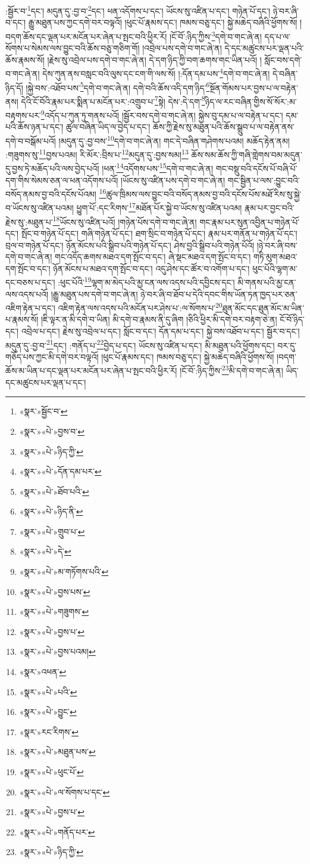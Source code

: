:སྦྱོར་བ་\footnote{«སྣར་»སྦྱོང་བ་}དང་། མདུན་དུ་:བྱ་བ་\footnote{«སྣར་»«པེ་»བྱས་བ་}དང་། ཕན་འདོགས་པ་དང་། ཡོངས་སུ་འཛིན་པ་དང་། གཉེན་པོ་དང་། ཉེ་བར་ཞི་བ་དང་། རྒྱུ་མཐུན་པས་ཀྱང་དགེ་བར་བལྟའོ། །ཕུང་པོ་རྣམས་དང་། ཁམས་བཅུ་དང་། སྐྱེ་མཆེད་བཞིའི་ཕྱོགས་སོ། །བདག་ཆོས་དང་ལྡན་པར་མངོན་པར་ཞེན་པ་སྤང་བའི་ཕྱིར་རོ། །ངོ་བོ་:ཉིད་ཀྱིས་\footnote{«སྣར་»«པེ་»ཉིད་ཀྱི་}དགེ་བ་གང་ཞེ་ན། དད་པ་ལ་སོགས་པ་སེམས་ལས་བྱུང་བའི་ཆོས་བཅུ་གཅིག་གོ། །འབྲེལ་པས་དགེ་བ་གང་ཞེ་ན། དེ་དང་མཚུངས་པར་ལྡན་པའི་ཆོས་རྣམས་སོ། །རྗེས་སུ་འབྲེལ་པས་དགེ་བ་གང་ཞེ་ན། དེ་དག་ཉིད་ཀྱི་བག་ཆགས་གང་ཡིན་པའོ། །
སློང་བས་དགེ་བ་གང་ཞེ་ན། དེས་ཀུན་ནས་བསླང་བའི་ལུས་དང་ངག་གི་ལས་སོ། །:དོན་དམ་པས་\footnote{«སྣར་»«པེ་»དོན་དམ་པར་}དགེ་བ་གང་ཞེ་ན། དེ་བཞིན་ཉིད་དོ། །སྐྱེ་བས་:འཐོབ་པས་\footnote{«སྣར་»«པེ་»ཐོབ་པའི་}དགེ་བ་གང་ཞེ་ན། དགེ་བའི་ཆོས་འདི་དག་ཉིད་\footnote{«སྣར་»«པེ་»ཉིད་ནི་}སྔོན་གོམས་པར་བྱས་པ་ལ་བརྟེན་ནས། དེའི་ངོ་བོའི་རྣམ་པར་སྨིན་པ་མངོན་པར་:འགྲུབ་པ་\footnote{«སྣར་»«པེ་»གྲུབ་པ་}སྟེ། དེས་:དེ་དག་\footnote{«སྣར་»«པེ་»དེ་}ཉིད་ལ་རང་བཞིན་གྱིས་སོ་སོར་:མ་བརྟགས་པར་\footnote{«སྣར་»«པེ་»མ་གཏོགས་པའི་}འདོད་པ་ཀུན་ཏུ་གནས་པའོ། །སྦྱོར་བས་དགེ་བ་གང་ཞེ་ན། སྐྱེས་བུ་དམ་པ་ལ་བརྟེན་པ་དང་། དམ་པའི་ཆོས་ཉན་པ་དང་། ཚུལ་བཞིན་ཡིད་ལ་བྱེད་པ་དང་། ཆོས་ཀྱི་རྗེས་སུ་མཐུན་པའི་ཆོས་སྒྲུབ་པ་ལ་བརྟེན་ནས་དགེ་བ་བསྒོམ་པའོ། །མདུན་དུ་:བྱ་བས་\footnote{«སྣར་»«པེ་»བྱས་པས་}དགེ་བ་གང་ཞེ་ན། གང་དེ་བཞིན་གཤེགས་པའམ། མཆོད་རྟེན་ནམ། :གཟུགས་སུ་\footnote{«སྣར་»«པེ་»གཟུགས་}བྱས་པའམ། རི་མོར་:བྲིས་པ་\footnote{«སྣར་»«པེ་»བྱས་པ་}མདུན་དུ་:བྱས་སམ།\footnote{«སྣར་»«པེ་»བྱས་པའམ།} ཆོས་སམ་ཆོས་ཀྱི་གཞི་གླེགས་བམ་མདུན་དུ་བྱས་ཏེ་མཆོད་པའི་ལས་བྱེད་པའོ། །ཕན་\footnote{«སྣར་»འཕན་}འདོགས་པས་\footnote{«སྣར་»«པེ་»པའི་}དགེ་བ་གང་ཞེ་ན། གང་བསྡུ་བའི་དངོས་པོ་བཞི་པོ་དག་གིས་སེམས་ཅན་ལ་ཕན་འདོགས་པའོ། །ཡོངས་སུ་འཛིན་པས་དགེ་བ་གང་ཞེ་ན། གང་སྦྱིན་པ་ལས་:བྱུང་བའི་བསོད་ནམས་བྱ་བའི་དངོས་པོའམ། \footnote{«སྣར་»«པེ་»བྱུང་}ཚུལ་ཁྲིམས་ལས་བྱུང་བའི་བསོད་ནམས་བྱ་བའི་དངོས་པོས་མཐོ་རིས་སུ་སྐྱེ་བ་ཡོངས་སུ་འཛིན་པའམ། ཕྱུག་པོ་:དང་རིགས་\footnote{«སྣར་»རང་རིགས་}མཐོན་པོར་སྐྱེ་བ་ཡོངས་སུ་འཛིན་པའམ། རྣམ་པར་བྱང་བའི་རྗེས་སུ་:མཐུན་པ་\footnote{«སྣར་»«པེ་»མཐུན་པས་}ཡོངས་སུ་འཛིན་པའོ། །གཉེན་པོས་དགེ་བ་གང་ཞེ་ན། གང་རྣམ་པར་སུན་འབྱིན་པ་གཉེན་པོ་དང་། སྤོང་བ་གཉེན་པོ་དང་། གཞི་གཉེན་པོ་དང་། ཐག་སྲིང་བ་གཉེན་པོ་དང་། རྣམ་པར་གནོན་པ་གཉེན་པོ་དང་། བྲལ་བ་གཉེན་པོ་དང་། ཉོན་མོངས་པའི་སྒྲིབ་པའི་གཉེན་པོ་དང་། ཤེས་བྱའི་སྒྲིབ་པའི་གཉེན་པོའོ། །ཉེ་བར་ཞི་བས་དགེ་བ་གང་ཞེ་ན། གང་འདོད་ཆགས་མཐའ་དག་སྤོང་བ་དང་། ཞེ་སྡང་མཐའ་དག་སྤོང་བ་དང་། གཏི་མུག་མཐའ་དག་སྤོང་བ་དང་། ཉོན་མོངས་པ་མཐའ་དག་སྤོང་བ་དང་། འདུ་ཤེས་དང་ཚོར་བ་འགོག་པ་དང་། ཕུང་པོའི་ལྷག་མ་དང་བཅས་པ་དང་། :ཕུང་པོའི་\footnote{«སྣར་»«པེ་»ཕུང་པོ་}ལྷག་མ་མེད་པའི་མྱ་ངན་ལས་འདས་པའི་དབྱིངས་དང་། མི་གནས་པའི་མྱ་ངན་ལས་འདས་པའོ། །རྒྱུ་མཐུན་པས་དགེ་བ་གང་ཞེ་ན། ཉེ་བར་ཞི་བ་ཐོབ་པ་དེའི་དབང་གིས་ཡོན་ཏན་ཁྱད་པར་ཅན་འཇིག་རྟེན་པ་དང་། འཇིག་རྟེན་ལས་འདས་པའི་མངོན་པར་ཤེས་པ་:ལ་སོགས་པ་\footnote{«སྣར་»«པེ་»ལ་སོགས་པ་དང་}ཐུན་མོང་དང་ཐུན་མོང་མ་ཡིན་པ་རྣམས་སོ། །ཇི་ལྟར་ན་མི་དགེ་བ་ཡིན། མི་དགེ་བ་རྣམས་ནི་དུ་ཞིག །ཅིའི་ཕྱིར་མི་དགེ་བར་བརྟག་ཅེ་ན། ངོ་བོ་ཉིད་དང་། འབྲེལ་པ་དང་། རྗེས་སུ་འབྲེལ་པ་དང་། སློང་བ་དང་། དོན་དམ་པ་དང་། སྐྱེ་བས་འཐོབ་པ་དང་། སྦྱོར་བ་དང་། མདུན་དུ་:བྱ་བ་\footnote{«སྣར་»«པེ་»བྱས་པ་}དང་། :གནོད་པ་\footnote{«སྣར་»«པེ་»གནོད་པར་}བྱེད་པ་དང་། ཡོངས་སུ་འཛིན་པ་དང་། མི་མཐུན་པའི་ཕྱོགས་དང་། བར་དུ་གཅོད་པས་ཀྱང་མི་དགེ་བར་བལྟའོ། །ཕུང་པོ་རྣམས་དང་། ཁམས་བཅུ་དང་། སྐྱེ་མཆེད་བཞིའི་ཕྱོགས་སོ། །བདག་ཆོས་མ་ཡིན་པ་དང་ལྡན་པར་མངོན་པར་ཞེན་པ་སྤང་བའི་ཕྱིར་རོ། །ངོ་བོ་:ཉིད་ཀྱིས་\footnote{«སྣར་»«པེ་»ཉིད་ཀྱི་}མི་དགེ་བ་གང་ཞེ་ན། ཡིད་དང་མཚུངས་པར་ལྡན་པ་དང་། 